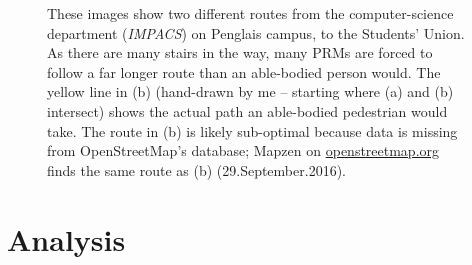 \begin{figure}
	\centering
	
	
	
	\caption[Longer routes for Persons with Reduced Mobility]{These images show two different routes from the computer-science department (\textit{IMPACS}) on Penglais campus, to the Students' Union. As there are many stairs in the way, many PRMs are forced to follow a far longer route than an able-bodied person would. The yellow line in (b) (hand-drawn by me -- starting where (a) and (b) intersect) shows the actual path an able-bodied pedestrian would take. The route in (b) is likely sub-optimal because data is missing from OpenStreetMap's database; Mapzen on \url{openstreetmap.org} finds the same route as (b) (29.September.2016).}
	\label{fig:longerRoutePRM}
\end{figure}

\section{Analysis}

